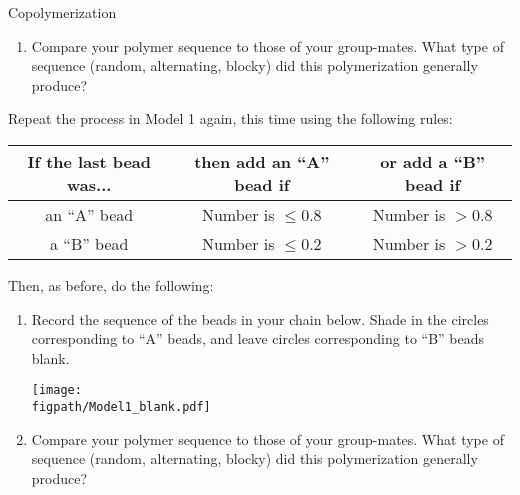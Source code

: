 \begin{activity}{Copolymerization}
\begin{ctqs}
\begin{enumerate}
			\item Compare your polymer sequence to those of your group-mates.  What type of sequence (random, alternating, blocky) did this polymerization generally produce?
			
				\begin{solution}[1.25in]\end{solution}
				
		\end{enumerate}
		
		\question \label{\labelbase:ctq:sim-blocky} Repeat the process in Model 1 again, this time using the following rules:	\begin{center}
					\renewcommand{\arraystretch}{1.5}
					\begin{tabular}{|c|c|c|}
						\hline
						\textbf{If the last bead was...} &  \textbf{then add an ``A'' bead if} & \textbf{or add a ``B'' bead if}\\\hline
						 an ``A'' bead & Number is $\leq 0.8$ & Number is $> 0.8$ \\\hline
						 a ``B'' bead & Number is $\leq 0.2$ & Number is $> 0.2$ \\\hline
					\end{tabular}
					\end{center}
	
		Then, as before, do the following:
		\begin{enumerate}
			\item Record the sequence of the beads in your chain below.  Shade in the circles corresponding to ``A'' beads, and leave circles corresponding to ``B'' beads blank.
	
		\vspace{6pt}
		\centerline{\texttt{[image: \\figpath/Model1\_blank.pdf]}}
		
			\item Compare your polymer sequence to those of your group-mates.  What type of sequence (random, alternating, blocky) did this polymerization generally produce?
			
				\begin{solution}[1.5in]
\end{solution}
\end{enumerate}
\end{ctqs}
\end{activity}
